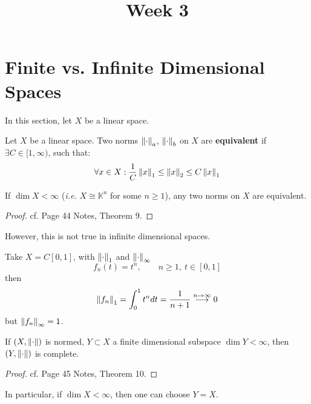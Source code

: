 \documentclass{article}
\title{Week 3}
\begin{document}
\maketitle

\section{Finite vs. Infinite Dimensional Spaces}

In this section, let $X$ be a linear space.  

\begin{definition}\label{equivalent norms}\rm\nextline
	Let $X$ be a linear space. Two norms $\left\|{\cdot}\right\|_a$, $\left\|{\cdot}\right\|_b$ on $X$ are {\bf equivalent} if $\exists C \in [1, \infty)$, such that:
 $$
    \forall x \in X: \frac{1}{C}\left\|{x}\right\|_1 \leq \left\|{x}\right\|_2 \leq C \left\|{x}\right\|_1
 $$
\end{definition}

\begin{proposition}\nextline
\label{Norms are equivalent in finite dim}
    If $\dim X < \infty$ (\textit{i.e.} $X \cong \mathbb{K}^n$ for some $n \geq 1$), any two norms on $X$ are equivalent.
\end{proposition}
\begin{proof}
    cf. Page 44 Notes, Theorem 9. 
\end{proof}

However, this is not true in infinite dimensional spaces.  

\begin{example}
    Take $X = C[0,1]$, with $\left\|{\cdot}\right\|_1$ and $\left\|{\cdot}\right\|_{\infty}$
    $$
    f_n(t) = t^n, \qquad n \geq 1, \ t\in [0,1]
    $$
    then  
    $$
    \left\|{f_n}\right\|_1 = \int_0^1 t^n dt = \frac{1}{n+1} \overset{n \to \infty}{\longrightarrow} 0
    $$
    but $\left\|{f_n}\right\|_{\infty}=1$.
\end{example}

\begin{proposition}
\label{finite dim is complete}
    If $(X, \left\|{\cdot}\right\|)$ is normed, $Y \subset X$ a finite dimensional subspace $\dim Y < \infty$, then $(Y, \left\|{\cdot}\right\|)$ is complete.
\end{proposition}  
\begin{proof}
    cf. Page 45 Notes, Theorem 10.
\end{proof}

\begin{remark}
In particular, if $\dim X < \infty$, then one can choose $Y=X$. 
\end{remark}  
\end{document}
